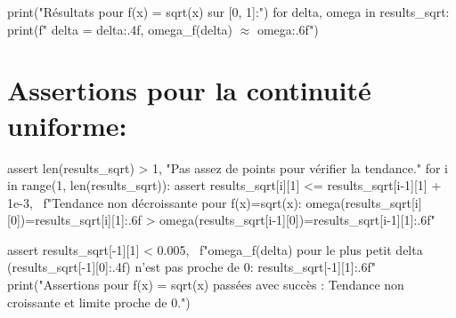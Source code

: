 \documentclass[12pt,a4paper]{report}
\begin{document}
print("Résultats pour f(x) = sqrt(x) sur [0, 1]:")
for delta, omega in results\_sqrt:
    print(f"  delta = {delta:.4f}, omega\_f(delta) $\approx$ {omega:.6f}")

\section{Assertions pour la continuité uniforme:}
assert len(results\_sqrt) > 1, "Pas assez de points pour vérifier la tendance."
for i in range(1, len(results\_sqrt)):
    assert results\_sqrt[i][1] <= results\_sqrt[i-1][1] + 1e-3, \
        f"Tendance non décroissante pour f(x)=sqrt(x): omega({results\_sqrt[i][0]})={results\_sqrt[i][1]:.6f} > omega({results\_sqrt[i-1][0]})={results\_sqrt[i-1][1]:.6f}"

assert results\_sqrt[-1][1] < 0.005, \
    f"omega\_f(delta) pour le plus petit delta ({results\_sqrt[-1][0]:.4f}) n'est pas proche de 0: {results\_sqrt[-1][1]:.6f}"
print("Assertions pour f(x) = sqrt(x) passées avec succès : Tendance non croissante et limite proche de 0.")
\end{document}
